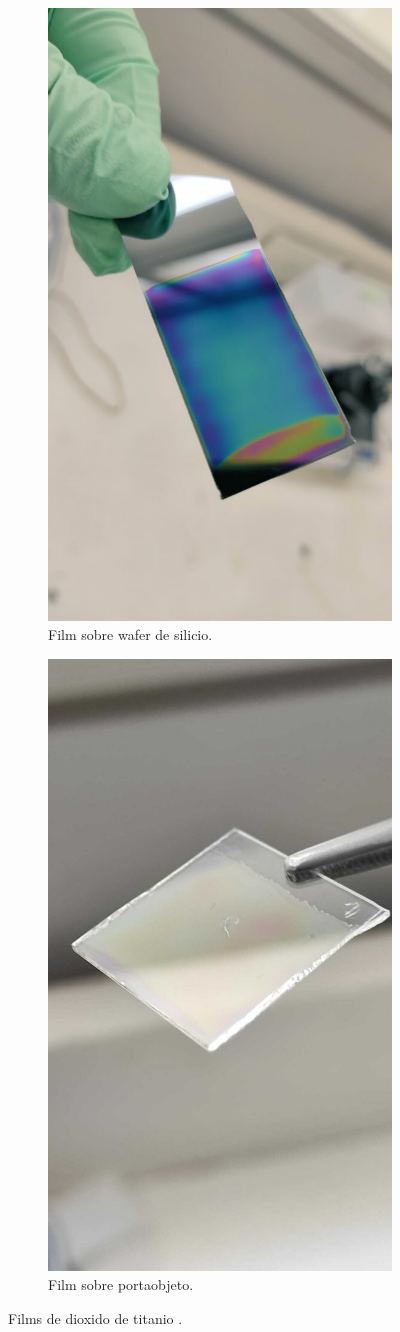 \begin{figure}[!htpb]
     \centering
     \begin{subfigure}[b]{0.4\textwidth}
         \centering
         \includegraphics[width=.5\textwidth]{./Figures/muestra_1.pdf}
         \caption{Film sobre wafer de silicio.}
         \label{fig:muestra_1}
     \end{subfigure}
     \hfill
     \begin{subfigure}[b]{0.4\textwidth}
         \centering
         \includegraphics[width=.5\textwidth]{./Figures/muestra_2.pdf}
         \caption{Film sobre portaobjeto.}
         \label{fig:muestra_"}
     \end{subfigure}
     \hfill
        \caption{Films de dioxido de titanio  \protect\footnotemark .}
        \label{fig:muestras}
\end{figure}

